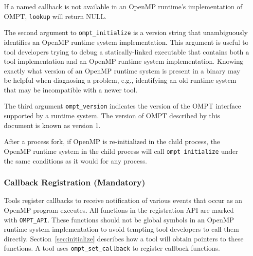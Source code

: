 \documentclass{article}
\begin{document}
\noindent
If a named callback is not available in an OpenMP runtime's implementation of OMPT, \verb|lookup| will return NULL.

The second argument to  \verb|ompt_initialize| is a version string that unambiguously identifies an OpenMP runtime system implementation. This argument is useful to tool developers trying to debug a statically-linked executable that contains both a tool implementation and an OpenMP runtime system implementation. Knowing exactly what version of an OpenMP runtime system is present in a binary may be helpful when diagnosing a problem, e.g., identifying an old runtime system that may be incompatible with a newer tool.

The third argument \verb|ompt_version| indicates the version of the OMPT interface supported by a runtime system.
The version of OMPT described by this document is known as version 1.

After a process fork, if OpenMP is re-initialized in the child process,
the OpenMP runtime system in the child process will call  \verb|ompt_initialize| under the same conditions as it would for any process. 


\subsubsection{Callback Registration (Mandatory)}
\label{sec:callback}
Tools register callbacks to receive notification of various events that occur as an OpenMP program executes.
 All functions in the registration API are marked with \verb|OMPT_API|. These functions should not be global symbols in an OpenMP runtime system implementation to avoid tempting tool developers to call them directly. Section~\ref{sec:initialize} describes how a tool will obtain pointers to these functions.
A tool uses
 \verb|ompt_set_callback| to register callback functions. 
 
\end{document}
